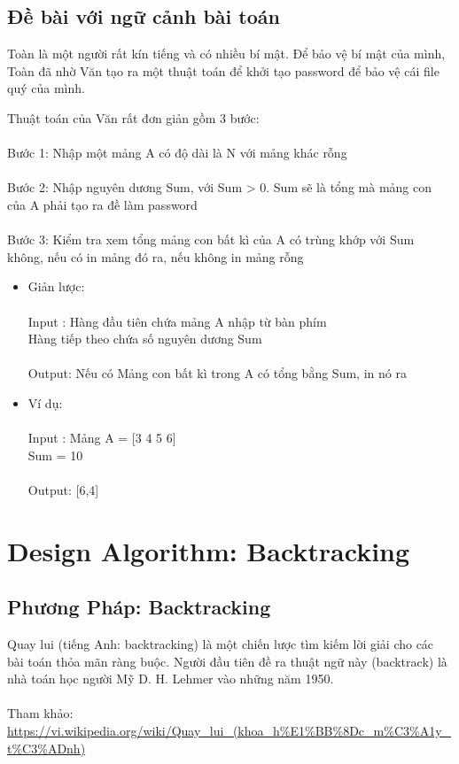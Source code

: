 \documentclass{article}
\begin{document}
    \subsection{ \fontsize{16}{16}\selectfont\textbf{Đề bài với ngữ cảnh bài toán}}
    Toàn là một người rất kín tiếng và có nhiều bí mật. Để bảo vệ bí mật của mình, Toàn đã nhờ Văn tạo ra một thuật toán để khởi tạo password để bảo vệ cái file quý của mình.

    Thuật toán của Văn rất đơn giản gồm 3 bước:\\\\
	Bước 1: Nhập một mảng A có độ dài là N với mảng khác rỗng\\\\
	Bước 2: Nhập nguyên dương Sum, với Sum > 0. Sum sẽ là tổng mà mảng con của A phải tạo ra đề làm password\\\\
	Bước 3: Kiểm tra xem tổng mảng con bất kì của A có trùng khớp với Sum không, nếu có in mảng đó ra, nếu không in mảng rỗng\\
	\begin{itemize}
	    \item Giản lược: \\\\
		Input : Hàng đầu tiên chứa mảng A nhập từ bàn phím \\
\hspace*{1.5cm} Hàng tiếp theo chứa số nguyên dương Sum \\\\
		Output: Nếu có Mảng con bất kì trong A có tổng bằng Sum, in nó ra  \\
	    \item Ví dụ: \\\\
	    Input : Mảng A = [3 4 5 6] \\
	    \hspace*{1.5cm}  Sum = 10\\\\
	    Output: [6,4]
	\end{itemize}
	\vfill


\newpage
\section{\fontsize{20}{20}\selectfont Design Algorithm: Backtracking} 

    \fontsize{16}{16}\selectfont 
    \subsection{ \fontsize{16}{16}\selectfont\textbf{Phương Pháp: Backtracking}}
    Quay lui (tiếng Anh: backtracking) là một chiến lược tìm kiếm lời giải cho các bài toán thỏa mãn ràng buộc. Người đầu tiên đề ra thuật ngữ này (backtrack) là nhà toán học người Mỹ D. H. Lehmer vào những năm 1950.\\\\
    Tham khảo: \url{https://vi.wikipedia.org/wiki/Quay_lui_(khoa_h%E1%BB%8Dc_m%C3%A1y_t%C3%ADnh)}
    
\end{document}
